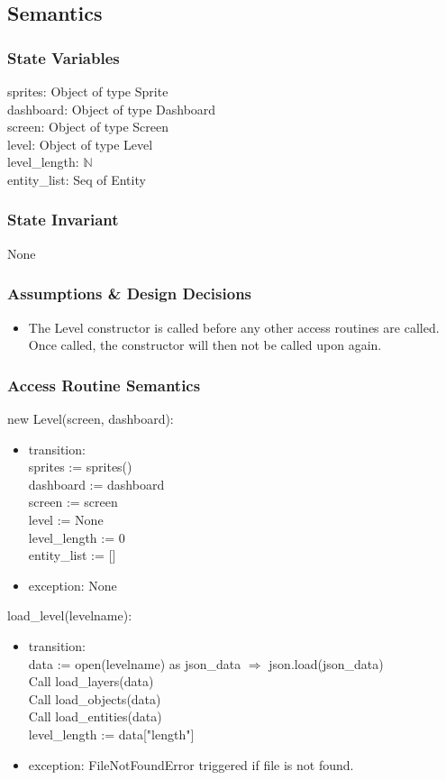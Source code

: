 \documentclass[12pt]{article}
\begin{document}
\subsection*{Semantics}
\subsubsection*{State Variables}
sprites: Object of type Sprite\\
dashboard: Object of type Dashboard\\
screen: Object of type Screen\\
level: Object of type Level\\
level\_length: $\mathbb{N}$\\
entity\_list: Seq of Entity

\subsubsection*{State Invariant}
None
\subsubsection*{Assumptions \& Design Decisions}
\begin{itemize}
    \item The Level constructor is called before any other access routines are called. Once called, the constructor will then not be called upon again.
\end{itemize}

\subsubsection*{Access Routine Semantics}
new Level(screen, dashboard):
\begin{itemize}
    \item transition:\\
    sprites := sprites()\\
    dashboard := dashboard\\
    screen := screen\\
    level := None\\
    level\_length := 0\\
    entity\_list := []\\
    \item exception: None
\end{itemize}

load\_level(levelname):
\begin{itemize}
    \item transition: \\
    data := open(levelname) as json\_data $\Rightarrow$ json.load(json\_data)\\ 
    Call load\_layers(data)\\
    Call load\_objects(data)\\
    Call load\_entities(data)\\
    level\_length := data["length"]
    \item exception: FileNotFoundError triggered if file is not found.
\end{itemize}
\end{document}
